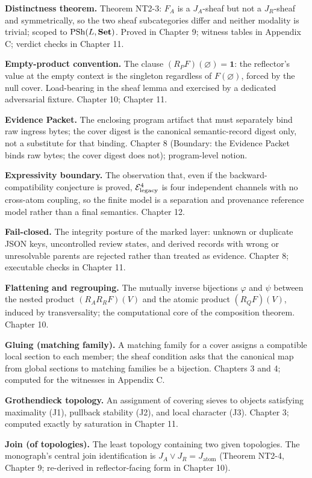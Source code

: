 \textbf{Distinctness theorem.} Theorem NT2-3: $F_A$ is a $J_A$-sheaf
but not a $J_R$-sheaf and symmetrically, so the two sheaf
subcategories differ and neither modality is trivial; scoped to
$\mathrm{PSh}(L, \mathbf{Set})$. Proved in Chapter 9; witness tables in Appendix C;
verdict checks in Chapter 11.

\textbf{Empty-product convention.} The clause
$(R_P F)(\varnothing) = \mathbf{1}$: the reflector's value at the
empty context is the singleton regardless of $F(\varnothing)$, forced
by the null cover. Load-bearing in the sheaf lemma and exercised by a
dedicated adversarial fixture. Chapter 10; Chapter 11.

\textbf{Evidence Packet.} The enclosing program artifact that must
separately bind raw ingress bytes; the cover digest is the canonical
semantic-record digest only, not a substitute for that binding.
Chapter 8 (Boundary: the Evidence Packet binds raw bytes; the cover
digest does not); program-level notion.

\textbf{Expressivity boundary.} The observation that, even if the
backward-compatibility conjecture is proved, $\mathcal{E}_{\mathrm{legacy}}^4$ is four
independent channels with no cross-atom coupling, so the finite model
is a separation and provenance reference model rather than a final
semantics. Chapter 12.

\textbf{Fail-closed.} The integrity posture of the marked layer:
unknown or duplicate JSON keys, uncontrolled review states, and
derived records with wrong or unresolvable parents are rejected
rather than treated as evidence. Chapter 8; executable checks in
Chapter 11.

\textbf{Flattening and regrouping.} The mutually inverse bijections
$\varphi$ and $\psi$ between the nested product
$(R_A R_R F)(V)$ and the atomic product $(R_Q F)(V)$, induced by
transversality; the computational core of the composition theorem.
Chapter 10.

\textbf{Gluing (matching family).} A matching family for a cover
assigns a compatible local section to each member; the sheaf
condition asks that the canonical map from global sections to
matching families be a bijection. Chapters 3 and 4; computed for the
witnesses in Appendix C.

\textbf{Grothendieck topology.} An assignment of covering sieves to
objects satisfying maximality (J1), pullback stability (J2), and
local character (J3). Chapter 3; computed exactly by saturation in
Chapter 11.

\textbf{Join (of topologies).} The least topology containing two
given topologies. The monograph's central join identification is
$J_A \vee J_R = J_{\mathrm{atom}}$ (Theorem NT2-4, Chapter 9;
re-derived in reflector-facing form in Chapter 10).

